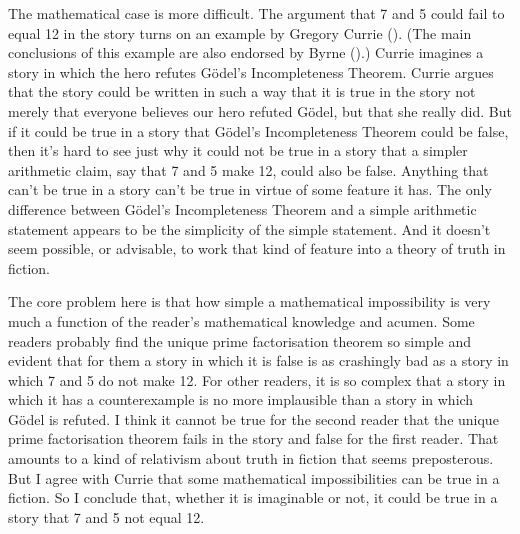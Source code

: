 \documentclass[
  10pt,
  letterpaper,
  DIV=11,
  numbers=noendperiod,
  twoside]{scrartcl}
\begin{document}
The mathematical case is more difficult. The argument that 7 and 5 could
fail to equal 12 in the story turns on an example by Gregory Currie
(). (The main conclusions of this example
are also endorsed by Byrne ().) Currie
imagines a story in which the hero refutes Gödel's Incompleteness
Theorem. Currie argues that the story could be written in such a way
that it is true in the story not merely that everyone believes our hero
refuted Gödel, but that she really did. But if it could be true in a
story that Gödel's Incompleteness Theorem could be false, then it's hard
to see just why it could not be true in a story that a simpler
arithmetic claim, say that 7 and 5 make 12, could also be false.
Anything that can't be true in a story can't be true in virtue of some
feature it has. The only difference between Gödel's Incompleteness
Theorem and a simple arithmetic statement appears to be the simplicity
of the simple statement. And it doesn't seem possible, or advisable, to
work that kind of feature into a theory of truth in fiction.

The core problem here is that how simple a mathematical impossibility is
very much a function of the reader's mathematical knowledge and acumen.
Some readers probably find the unique prime factorisation theorem so
simple and evident that for them a story in which it is false is as
crashingly bad as a story in which 7 and 5 do not make 12. For other
readers, it is so complex that a story in which it has a counterexample
is no more implausible than a story in which Gödel is refuted. I think
it cannot be true for the second reader that the unique prime
factorisation theorem fails in the story and false for the first reader.
That amounts to a kind of relativism about truth in fiction that seems
preposterous. But I agree with Currie that some mathematical
impossibilities can be true in a fiction. So I conclude that, whether it
is imaginable or not, it could be true in a story that 7 and 5 not equal
12.
\end{document}
